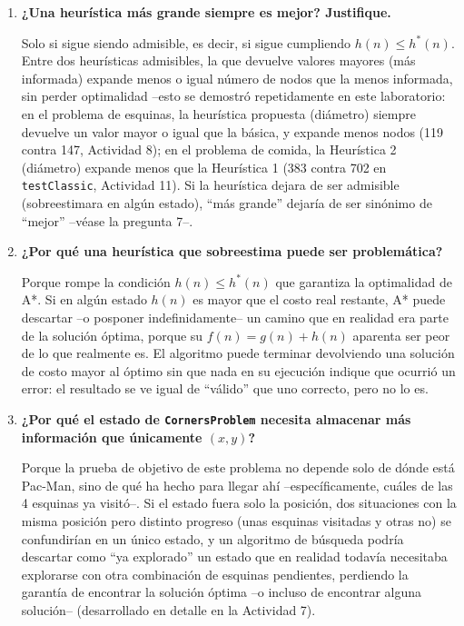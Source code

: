 \begin{enumerate}
Manhattan, con menos nodos expandidos (15 contra 16 en \texttt{mediumClassic}, Actividad 6), aunque
ambas heurísticas encuentran el mismo costo óptimo (12). La razón es que Pac-Man solo se mueve en
las cuatro direcciones cardinales (nunca en diagonal), y matemáticamente $h_E(n) \le h_M(n)$
siempre (la distancia en línea recta nunca es mayor que la distancia recorrida por una cuadrícula).
Por lo tanto Manhattan es una cota más ajustada --más informada-- sin dejar de ser admisible, y una
heurística admisible más informada expande menos nodos (ver pregunta 6).

\item \textbf{¿Una heurística más grande siempre es mejor? Justifique.}

Solo si sigue siendo admisible, es decir, si sigue cumpliendo $h(n) \le h^*(n)$. Entre dos
heurísticas admisibles, la que devuelve valores mayores (más informada) expande menos o igual
número de nodos que la menos informada, sin perder optimalidad --esto se demostró repetidamente en
este laboratorio: en el problema de esquinas, la heurística propuesta (diámetro) siempre devuelve
un valor mayor o igual que la básica, y expande menos nodos (119 contra 147, Actividad 8); en el
problema de comida, la Heurística 2 (diámetro) expande menos que la Heurística 1 (383 contra 702 en
\texttt{testClassic}, Actividad 11). Si la heurística dejara de ser admisible (sobreestimara en
algún estado), ``más grande'' dejaría de ser sinónimo de ``mejor'' --véase la pregunta 7--.

\item \textbf{¿Por qué una heurística que sobreestima puede ser problemática?}

Porque rompe la condición $h(n) \le h^*(n)$ que garantiza la optimalidad de A*. Si en algún estado
$h(n)$ es mayor que el costo real restante, A* puede descartar --o posponer indefinidamente-- un
camino que en realidad era parte de la solución óptima, porque su $f(n) = g(n) + h(n)$ aparenta ser
peor de lo que realmente es. El algoritmo puede terminar devolviendo una solución de costo mayor al
óptimo sin que nada en su ejecución indique que ocurrió un error: el resultado se ve igual de
``válido'' que uno correcto, pero no lo es.

\item \textbf{¿Por qué el estado de \texttt{CornersProblem} necesita almacenar más información que
únicamente $(x, y)$?}

Porque la prueba de objetivo de este problema no depende solo de dónde está Pac-Man, sino de qué ha
hecho para llegar ahí --específicamente, cuáles de las 4 esquinas ya visitó--. Si el estado fuera
solo la posición, dos situaciones con la misma posición pero distinto progreso (unas esquinas
visitadas y otras no) se confundirían en un único estado, y un algoritmo de búsqueda podría
descartar como ``ya explorado'' un estado que en realidad todavía necesitaba explorarse con otra
combinación de esquinas pendientes, perdiendo la garantía de encontrar la solución óptima --o
incluso de encontrar alguna solución-- (desarrollado en detalle en la Actividad 7).


\end{enumerate}
